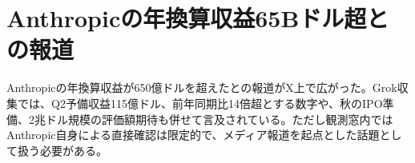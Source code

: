 \section{Anthropicの年換算収益65Bドル超との報道}
Anthropicの年換算収益が650億ドルを超えたとの報道がX上で広がった。Grok収集では、Q2予備収益115億ドル、前年同期比14倍超とする数字や、秋のIPO準備、2兆ドル規模の評価額期待も併せて言及されている。ただし観測窓内ではAnthropic自身による直接確認は限定的で、メディア報道を起点とした話題として扱う必要がある。
